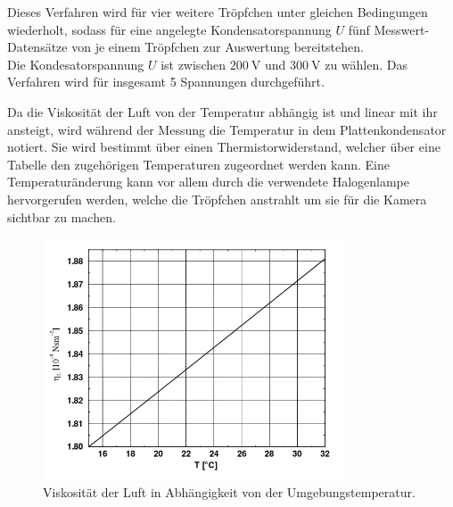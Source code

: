 Dieses Verfahren wird für vier weitere Tröpfchen unter gleichen Bedingungen wiederholt, sodass für eine angelegte Kondensatorspannung $U$ fünf Messwert-Datensätze von je einem Tröpfchen zur Auswertung bereitstehen.\\
Die Kondesatorspannung $U$ ist zwischen $\SI{200}{\volt}$ und $\SI{300}{\volt}$ zu wählen.
Das Verfahren wird für insgesamt 5 Spannungen durchgeführt.

Da die Viskosität der Luft von der Temperatur abhängig ist und linear mit ihr ansteigt,
wird während der Messung  die Temperatur in dem Plattenkondensator notiert. Sie wird bestimmt über einen Thermistorwiderstand, welcher über eine Tabelle den zugehörigen Temperaturen zugeordnet werden kann. Eine Temperaturänderung kann vor allem durch die verwendete Halogenlampe hervorgerufen werden, welche die Tröpfchen anstrahlt um sie für die Kamera sichtbar zu machen.


\begin{figure}[h]
	\centering
	\includegraphics[width=0.8\textwidth]{Bilder/Temp.png}
	\caption{Viskosität der Luft in Abhängigkeit von der Umgebungstemperatur. \cite{skript}}
	\label{fig:temp}
\end{figure}


